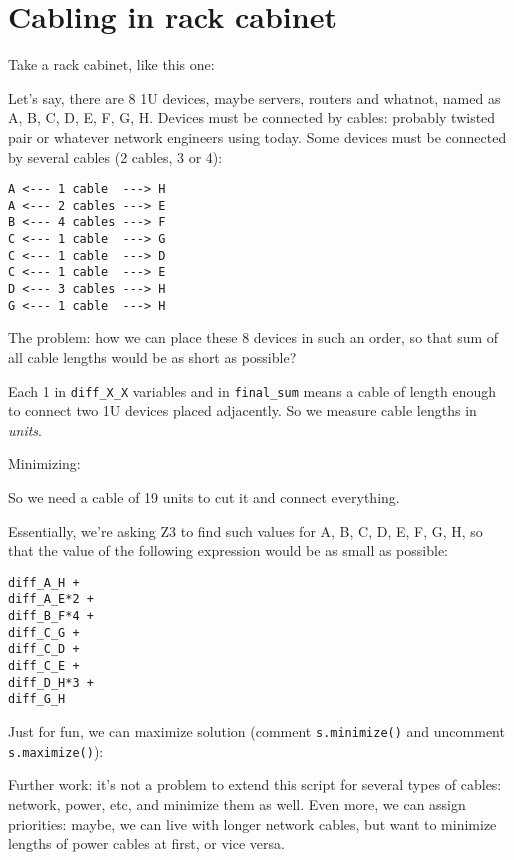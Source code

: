 \section{Cabling in rack cabinet}

\renewcommand{\CURPATH}{MaxSxT/cabling}

Take a rack cabinet, like this one:

\begin{figure}[H]
\centering
{}
\end{figure}

Let's say, there are 8 1U devices, maybe servers, routers and whatnot, named as A, B, C, D, E, F, G, H.
Devices must be connected by cables: probably twisted pair or whatever network engineers using today.
Some devices must be connected by several cables (2 cables, 3 or 4):

\begin{lstlisting}
A <--- 1 cable  ---> H
A <--- 2 cables ---> E
B <--- 4 cables ---> F
C <--- 1 cable  ---> G
C <--- 1 cable  ---> D
C <--- 1 cable  ---> E
D <--- 3 cables ---> H
G <--- 1 cable  ---> H
\end{lstlisting}

The problem: how we can place these 8 devices in such an order, so that sum of all cable lengths would be as short as possible?



Each 1 in \verb|diff_X_X| variables and in \verb|final_sum| means a cable of length enough to connect two 1U devices placed adjacently.
So we measure cable lengths in \emph{units}.

Minimizing:



So we need a cable of 19 units to cut it and connect everything.

Essentially, we're asking Z3 to find such values for A, B, C, D, E, F, G, H, so that the value of the following expression would be as small as possible:

\begin{lstlisting}
diff_A_H +                                                                                                             
diff_A_E*2 +
diff_B_F*4 +
diff_C_G +
diff_C_D +
diff_C_E +
diff_D_H*3 +
diff_G_H
\end{lstlisting}

Just for fun, we can maximize solution (comment \verb|s.minimize()| and uncomment \verb|s.maximize()|):



Further work: it's not a problem to extend this script for several types of cables: network, power, etc, and minimize them as well.
Even more, we can assign priorities: maybe, we can live with longer network cables, but want to minimize lengths of power cables at first,
or vice versa.

